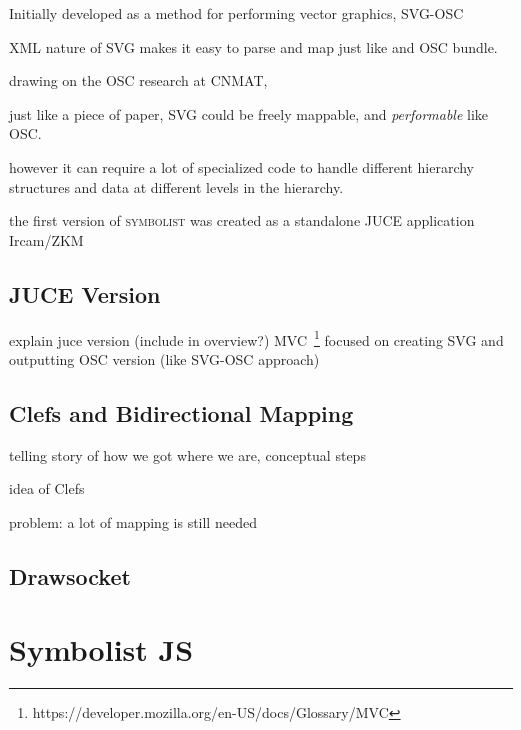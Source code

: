 \documentclass{article}
\def\symbolist{\textsc{symbolist}\xspace}
\begin{document}
Initially developed as a method for performing vector graphics, 
SVG-OSC  \cite{gottfried2015svg}

\cite{maccallum2015dynamic} %


XML nature of SVG makes it easy to parse and map just like and OSC bundle.

drawing on the OSC research at CNMAT, 

just like a piece of paper, SVG could be freely mappable, and \textit{performable} like OSC.



however it can require a lot of specialized code to handle different hierarchy structures and data at different levels in the hierarchy.


the first version of \symbolist was created as a standalone JUCE application
Ircam/ZKM~\cite{gottfried2018symbolist}

\subsection{JUCE Version}\label{sec:juce_version}

explain juce version (include in overview?)
MVC~\footnote{https://developer.mozilla.org/en-US/docs/Glossary/MVC} %
focused on creating SVG and outputting OSC version (like SVG-OSC approach)


\subsection{Clefs and Bidirectional Mapping}\label{sec:bidirectional_mapping}

telling story of how we got where we are, conceptual steps

idea of Clefs

problem:
a lot of mapping is still needed

\subsection{Drawsocket}\label{sec:drawsocket}

\cite{gottfried2019drawsocket}
\cite{hajdu2005quintet}



\section{Symbolist JS}\label{sec:symbolist_js}
\end{document}
